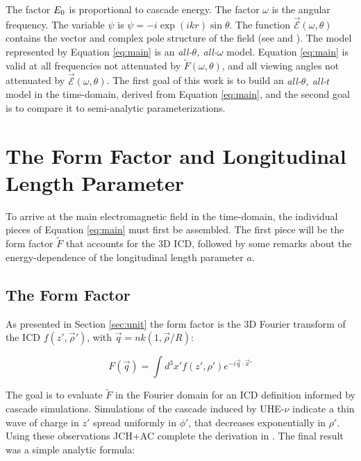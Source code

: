 \documentclass[amsmath,amssymb,aps,prd,10pt,twocolumn]{revtex4}
\begin{document}
The factor $E_{\rm 0}$ is proportional to cascade energy.  The factor $\omega$ is the angular frequency.  The variable $\psi$ is $\psi = -i \exp(ikr) \sin\theta$.  The function $\vec{\mathcal{E}}(\omega,\theta)$ contains the vector and complex pole structure of the field (see \cite{10.1103/physrevd.65.016003} and \cite{10.1016/j.astropartphys.2017.03.008}).  The model represented by Equation \ref{eq:main} is an \textit{all-$\theta$, all-$\omega$} model.  Equation \ref{eq:main} is valid at all frequencies not attenuated by $\widetilde{F}(\omega,\theta)$, and all viewing angles not attenuated by $\vec{\mathcal{E}}(\omega,\theta)$.  The first goal of this work is to build an \textit{all-$\theta$, all-$t$} model in the time-domain, derived from Equation \ref{eq:main}, and the second goal is to compare it to semi-analytic parameterizations.

\section{The Form Factor and Longitudinal Length Parameter}
\label{sec:ff}

To arrive at the main electromagnetic field in the time-domain, the individual pieces of Equation \ref{eq:main} must first be assembled.  The first piece will be the form factor $\widetilde{F}$ that accounts for the 3D ICD, followed by some remarks about the energy-dependence of the longitudinal length parameter $a$.

\subsection{The Form Factor}
\label{sec:ff1}

As presented in Section \ref{sec:unit} the form factor is the 3D Fourier transform of the ICD $f(z',\vec{\rho}')$, with $\vec{q} = nk(1, \vec{\rho}/R)$:

\begin{equation}
F(\vec{q}) = \int d^3 x' f(z',\rho') e^{-i \vec{q} \cdot \vec{x}'}
\end{equation}

The goal is to evaluate $\widetilde{F}$ in the Fourier domain for an ICD definition informed by cascade simulations.  Simulations of the cascade induced by UHE-$\nu$ indicate a thin wave of charge in $z'$ spread uniformly in $\phi'$, that decreases exponentially in $\rho'$.  Using these observations JCH+AC complete the derivation in \cite{10.1016/j.astropartphys.2017.03.008}.  The final result was a simple analytic formula:
\end{document}
